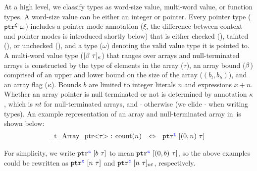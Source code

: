 At a high level, we classify types as word-size value, multi-word
value, or function types. A word-size value can be either an integer or pointer.
Every pointer type ($\mathtt{ptr}^{\xi}~{\omega}$) includes a
pointer mode annotation ($\xi$, the difference between context and pointer modes
is introduced shortly below) that is either checked (\cmode), tainted (\tmode),
or unchecked (\umode), and a type ($\omega$) denoting the valid value type it is pointed to.
A multi-word value type ($ [{\beta}~{\tau}]_{\kappa}$) that ranges over 
arrays and null-terminated arrays is constructed by the type of elements in the
array ($\tau$), an array bound ($\beta$) comprised of an upper and
lower bound on the size of the array ($(b_l,b_h)$), and an array flag ($\kappa$).
Bounds $b$ are
limited to integer literals $n$ and expressions $x + n$.
Whether an array pointer is null terminated or not is determined by annotation
$\kappa$, which is $nt$ for null-terminated arrays, and $\cdot$
otherwise (we elide $\cdot$ when writing types).
An example representation of an array and null-terminated array in~\systemname is shown below:
% 
\[\hspace*{-0.5em}
\begin{array}{l}
\begin{array}{rcl}
$\code{_t_Array_ptr<}$\tau$\code{> : count(}$n$\code{)}$
&\Leftrightarrow& \tarrayptr{0}{n}{\tau}{\tmode}
\end{array}
\end{array}
\]

For simplicity, we write
$\mathtt{ptr}^{\textcolor{blue}{\texttt{c}}}~{[{b}~{\tau}]}$ to mean $\mathtt{ptr}^{\textcolor{blue}{\texttt{c}}}~{[{({0},{b})}~{\tau}]}$,
so the above examples could be rewritten as $\mathtt{ptr}^{\textcolor{blue}{\texttt{c}}}~{[{n}~{\tau}]}$ and
$\mathtt{ptr}^{\textcolor{blue}{\texttt{c}}}~{[{n}~{\tau}]_{nt}}$, respectively.

